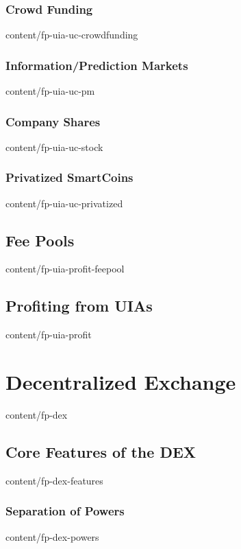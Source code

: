 \documentclass{btswhitepaper}
\begin{document}
\subsubsection  { Crowd Funding                                    }  { content/fp-uia-uc-crowdfunding } 
\subsubsection  { Information/Prediction Markets                   }  { content/fp-uia-uc-pm           } 
\subsubsection  { Company Shares                                   }  { content/fp-uia-uc-stock        } 
\subsubsection  { Privatized SmartCoins                            }  { content/fp-uia-uc-privatized   } 
\subsection     { Fee Pools                                        }  { content/fp-uia-profit-feepool  } 
\subsection     { Profiting from UIAs                              }  { content/fp-uia-profit          } 

\section        { Decentralized Exchange                           }  { content/fp-dex                 } 
\subsection     { Core Features of the DEX                         }  { content/fp-dex-features        } 
\subsubsection  { Separation of Powers                             }  { content/fp-dex-powers          } 
\end{document}

